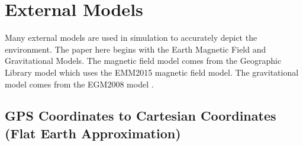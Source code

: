 
\section{External Models}

Many external models are used in simulation to accurately depict the
environment. The paper here begins with the Earth Magnetic Field
and Gravitational Models. The magnetic field model comes from the Geographic
Library model which uses the EMM2015 magnetic field model. The
gravitational model comes from the EGM2008 model
\cite{GeographicLib}.

\subsection{GPS Coordinates to Cartesian Coordinates (Flat Earth Approximation)}\label{s:llh_to_cartesian}


